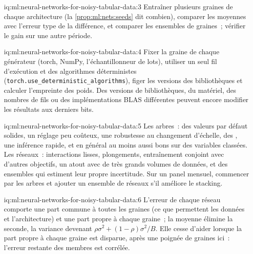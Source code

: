 \begin{solution}{iq:ml:neural-networks-for-noisy-tabular-data:3}
Entraîner plusieurs graines de chaque architecture (la \cref{prop:ml:nets:seeds} dit combien), comparer les moyennes avec l'erreur type de la
différence, et comparer les ensembles de graines~; vérifier le gain sur une autre période.
\end{solution}

\begin{solution}{iq:ml:neural-networks-for-noisy-tabular-data:4}
Fixer la graine de chaque générateur (torch, NumPy, l'échantillonneur de lots), utiliser un seul fil d'exécution et des algorithmes déterministes
(\texttt{torch.use\_deterministic\_algorithms}),
figer les versions des bibliothèques et calculer l'empreinte des poids. Des versions de bibliothèques, du matériel, des nombres de fils ou des implémentations BLAS différentes peuvent
encore modifier les résultats aux derniers bits.
\end{solution}

\begin{solution}{iq:ml:neural-networks-for-noisy-tabular-data:5}
Les arbres~: des valeurs par défaut solides, un réglage peu coûteux, une robustesse au changement d'échelle, des , une inférence rapide, et en général au moins aussi bons
sur des variables classées. Les réseaux~: interactions lisses, plongements, entraînement conjoint avec d'autres objectifs, un atout avec
de très grands volumes de données, et des ensembles qui estiment leur propre incertitude. Sur un panel mensuel, commencer par les arbres et ajouter un
ensemble de réseaux s'il améliore le stacking.
\end{solution}

\begin{solution}{iq:ml:neural-networks-for-noisy-tabular-data:6}
L'erreur de chaque réseau comporte une part commune à toutes les graines (ce que permettent les données et l'architecture) et une part propre à chaque graine~;
la moyenne élimine la seconde, la variance devenant $\rho\sigma^2 + (1-\rho)\sigma^2/B$. Elle cesse d'aider lorsque la part propre à chaque graine est
disparue, après une poignée de graines ici~: l'erreur restante des membres est corrélée.
\end{solution}
